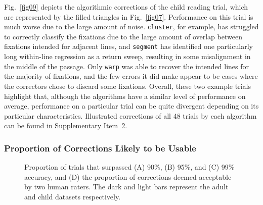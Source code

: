 \documentclass[doc,biblatex]{apa7}
\begin{document}
Fig.~\ref{fig09} depicts the algorithmic corrections of the child reading trial, which are represented by the filled triangles in Fig.~\ref{fig07}. Performance on this trial is much worse due to the large amount of noise. \texttt{cluster}, for example, has struggled to correctly classify the fixations due to the large amount of overlap between fixations intended for adjacent lines, and \texttt{segment} has identified one particularly long within-line regression as a return sweep, resulting in some misalignment in the middle of the passage. Only \texttt{warp} was able to recover the intended lines for the majority of fixations, and the few errors it did make appear to be cases where the correctors chose to discard some fixations. Overall, these two example trials highlight that, although the algorithms have a similar level of performance on average, performance on a particular trial can be quite divergent depending on its particular characteristics. Illustrated corrections of all 48 trials by each algorithm can be found in Supplementary Item~2.

\subsubsection{Proportion of Corrections Likely to be Usable}

	\begin{figure}
	\vspace*{2pt}
	\caption{Proportion of trials that surpassed (A) 90\%, (B) 95\%, and (C) 99\% accuracy, and (D) the proportion of corrections deemed acceptable by two human raters. The dark and light bars represent the adult and child datasets respectively.}
	\label{fig10}
	\end{figure}
\end{document}
